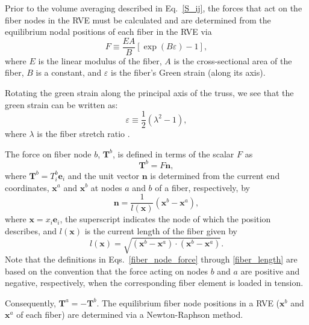 Prior to the volume averaging described in Eq.\ \eqref{S_ij}, the forces that act on the fiber nodes in the RVE must be calculated and are determined from the equilibrium nodal positions of each fiber in the RVE via 
%
\begin{equation}
F \equiv \frac{E A}{B}[\exp(B \varepsilon) - 1],
\label{fiber_force}
\end{equation}
%
where $E$ is the linear modulus of the fiber, $A$ is the cross-sectional area of the fiber, $B$ is a constant, and $\varepsilon$ is the fiber's Green strain (along its axis).

Rotating the green strain along the principal axis of the truss, we see that the green strain can be written as:
%
\begin{equation}
\varepsilon \equiv \frac{1}{2} \left(\lambda^2-1\right),
\label{Green_strain}
\end{equation}
% 
where $\lambda$ is the fiber stretch ratio \cite{Chandran:2007hy}. 

The force on fiber node $b$, $\textbf{T}^b$, is defined in terms of the scalar $F$ as
%
\begin{equation}
\textbf{T}^b = F \textbf{n},
\label{fiber_node_force}
\end{equation}
%
where $\textbf{T}^b = T^b_i \textbf{e}_i$ and the unit vector $\textbf{n}$ is determined from the current end coordinates, $\textbf{x}^a$ and $\textbf{x}^b$ at nodes $a$ and $b$ of a fiber, respectively, by
%
\begin{equation}
\textbf{n} = \frac{1}{l(\textbf{x})}(\textbf{x}^b - \textbf{x}^a),
\end{equation}
%
where $\textbf{x} = x_i \textbf{e}_i$, the superscript indicates the node of which the position describes, and $l(\textbf{x})$ is the current length of the fiber given by
%
\begin{equation}
l(\textbf{x}) = \sqrt{(\textbf{x}^b - \textbf{x}^a) \cdot (\textbf{x}^b - \textbf{x}^a)}.
\label{fiber_length}
\end{equation}
%
Note that the definitions in Eqs.\ \eqref{fiber_node_force} through \eqref{fiber_length} are based on the convention that the force acting on nodes $b$ and $a$ are positive and negative, respectively, when the corresponding fiber element is loaded in tension.

Consequently, $\textbf{T}^a = - \textbf{T}^b$. The equilibrium fiber node positions in a RVE ($\textbf{x}^b$ and $\textbf{x}^a$ of each fiber) are determined via a Newton-Raphson method.

